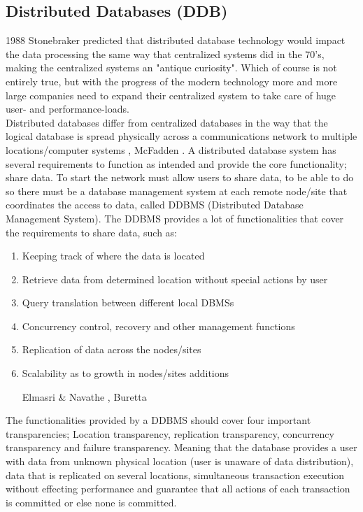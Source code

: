 \documentclass{cslthse-msc}
\begin{document}
\subsection{Distributed Databases (DDB)}
1988 Stonebraker \cite{DDBMSvsCDBMS} predicted that distributed database technology would impact the data processing the same way that centralized systems did in the 70's, making the centralized systems an "antique curiosity". Which of course is not entirely true, but with the progress of the modern technology more and more large companies need to expand their centralized system to take care of huge user- and performance-loads.\\  
Distributed databases differ from centralized databases in the way that the logical database is spread physically across a communications network to multiple locations/computer systems , McFadden \cite{DDBMS}. A distributed database system has several requirements to function as intended and provide the core functionality; share data. To start the network must allow users to share data, to be able to do so there must be a database management system at each remote node/site that coordinates the access to data, called DDBMS (Distributed Database Management System). The DDBMS provides a lot of functionalities that cover the requirements to share data, such as: \begin{enumerate}
\item Keeping track of where the data is located
\item Retrieve data from determined location without special actions by user
\item Query translation between different local DBMSs
\item Concurrency control, recovery and other management functions
\item Replication of data across the nodes/sites
\item Scalability as to growth in nodes/sites additions \begin{flushright}  Elmasri \& Navathe \cite{functionsDDBMS}, Buretta \cite{datareplication}   \end{flushright}
\end{enumerate}      
The functionalities provided by a DDBMS should cover four important transparencies; Location transparency, replication transparency, concurrency transparency and failure transparency. Meaning that the database provides a user with data from unknown physical location (user is unaware of data distribution), data that is replicated on several locations, simultaneous transaction execution without effecting performance and guarantee that all actions of each transaction is committed or else none is committed.\\\\
\end{document}
